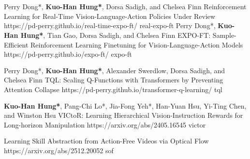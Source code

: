 
\section{\texorpdfstring{}{Publications}}
  \resumePubItemListStart
    \resumePubItem    
          {Perry Dong*, \textbf{Kuo-Han Hung*}, Dorsa Sadigh, and Chelsea Finn}
          {Reinforcement Learning for Real-Time Vision-Language-Action Policies}
          {Under Review}
          {https://pd-perry.github.io/real-time-expo-ft/}
          {real-expo-ft}
    \resumePubItem    
          {Perry Dong*, \textbf{Kuo-Han Hung*}, Tian Gao, Dorsa Sadigh, and Chelsea Finn}
          {EXPO-FT: Sample-Efficient Reinforcement Learning Finetuning for Vision-Language-Action Models}
          {}
          {https://pd-perry.github.io/expo-ft/}
          {expo-ft}
          
    \resumePubItem    
          {Perry Dong*, \textbf{Kuo-Han Hung*}, Alexander Swerdlow, Dorsa Sadigh, and Chelsea Finn}
          {TQL: Scaling Q-Functions with Transformers by Preventing Attention Collapse}
          {}
          {https://pd-perry.github.io/transformer-q-learning/}
          {tql}
          
  \resumePubItem
    {\textbf{Kuo-Han Hung*}, Pang-Chi Lo*, Jia-Fong Yeh*, Han-Yuan Hsu, Yi-Ting Chen, and Winston Hsu}
    {VICtoR: Learning Hierarchical Vision-Instruction Rewards for Long-horizon Manipulation}
    {}
    {https://arxiv.org/abs/2405.16545}
    {victor}

  \resumePubItem
      {}
      {Learning Skill Abstraction from Action-Free Videos via Optical Flow}
      {}
      {https://arxiv.org/abs/2512.20052}
      {sof}


